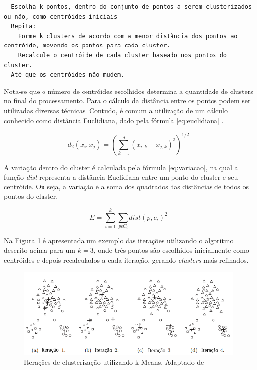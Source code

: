 \begin{center}
  \lstset{language=HTML, numbers=left, stepnumber=1}
  \begin{lstlisting}
  Escolha k pontos, dentro do conjunto de pontos a serem clusterizados ou não, como centróides iniciais
  Repita:
    Forme k clusters de acordo com a menor distância dos pontos ao centróide, movendo os pontos para cada cluster.
    Recalcule o centróide de cada cluster baseado nos pontos do cluster.
  Até que os centróides não mudem.
  \end{lstlisting}
\end{center}


Nota-se que o número de centróides escolhidos determina a quantidade de clusters no final do processamento.
Para o cálculo da distância entre os pontos podem ser utilizadas diversas técnicas. Contudo, é comum a utilização de um cálculo conhecido como distância Euclidiana, 
dado pela fórmula \ref{eq:euclidiana} \cite{clustering_review, tan2013data, han2011data}.

\begin{equation} \label{eq:euclidiana}
  d_{2}(x_i, x_j) = (\sum_{k=1}^{d} (x_{i,k} - x_{j,k})^2)^{1/2}
\end{equation}

A variação dentro do cluster é calculada pela fórmula \ref{eq:variacao}, na qual a 
função \textit{dist} representa a distância Euclidiana entre um ponto do
cluster e seu centróide. Ou seja, a variação é a soma dos quadrados
das distâncias de todos os pontos do cluster.

\begin{equation} \label{eq:variacao}
  E = \sum_{i=1}^{k} \sum_{p \epsilon C_{i}} dist(p, c_i)^2
\end{equation}

Na Figura \ref{fig:iteracoes_kmeans} é apresentada um exemplo das iterações utilizando o algoritmo descrito acima para um $k = 3$,
onde três pontos são escolhidos inicialmente como centróides e depois recalculados a cada iteração, gerando \textit{clusters} mais
refinados.

\begin{figure}[h!]
\centering
\includegraphics[scale=0.6]{figuras/iteracoes_kmeans.png}
\caption{Iterações de clusterização utilizando k-Means. Adaptado de }
\label{fig:iteracoes_kmeans}
\end{figure}

